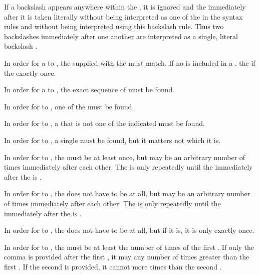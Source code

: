 \noindent If a backslash appears anywhere within the , it is ignored and the  immediately after it is taken literally without being interpreted as one of the  in the syntax rules and without being interpreted using this backslash rule. Thus two backslashes immediately after one another are interpreted as a single, literal backslash .

\noindent In order for a  to , the  supplied with the  must match. If no  is included in a , the   if the   exactly once.

\noindent In order for a  to , the exact sequence of  must be found.

\noindent In order for  to , one of the  must be found.

\noindent In order for  to , a  that is not one of the indicated  must be found.

\noindent In order for  to , a single  must be found, but it matters not which  it is.

\noindent In order for  to , the  must be  at least once, but may be  an arbitrary number of times immediately after each other. The  is only repeatedly  until the  immediately after the  is .

\noindent In order for  to , the  does not have to be  at all, but may be  an arbitrary number of times immediately after each other. The  is only repeatedly  until the  immediately after the  is .

\noindent In order for  to , the  does not have to be  at all, but if it is, it is only  exactly once.

\noindent In order for  to , the  must be  at least the number of times of the first . If only the comma is provided after the first , it may  any number of times greater than the first . If the second  is provided, it cannot  more times than the second .

